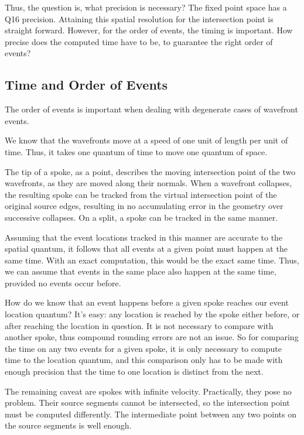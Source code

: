 \documentclass[12pt,a4paper,oneside,openany]{article}
\begin{document}
Thus, the question is, what precision is necessary? The fixed point space has a Q16 precision. Attaining this spatial resolution for the intersection point is straight forward. However, for the order of events, the timing is important. How precise does the computed time have to be, to guarantee the right order of events?

\subsection{Time and Order of Events}

The order of events is important when dealing with degenerate cases of wavefront events.

We know that the wavefronts move at a speed of one unit of length per unit of time. Thus, it takes one quantum of time to move one quantum of space.

The tip of a spoke, as a point, describes the moving intersection point of the two wavefronts, as they are moved along their normals. When a wavefront collapses, the resulting spoke can be tracked from the virtual intersection point of the original source edges, resulting in no accumulating error in the geometry over successive collapses. On a split, a spoke can be tracked in the same manner.

Assuming that the event locations tracked in this manner are accurate to the spatial quantum, it follows that all events at a given point must happen at the same time. With an exact computation, this would be the exact same time. Thus, we can assume that events in the same place also happen at the same time, provided no events occur before.

How do we know that an event happens before a given spoke reaches our event location quantum? It's easy: any location is reached by the spoke either before, or after reaching the location in question. It is not necessary to compare with another spoke, thus compound rounding errors are not an issue. So for comparing the time on any two events for a given spoke, it is only necessary to compute time to the location quantum, and this comparison only has to be made with enough precision that the time to one location is distinct from the next.

The remaining caveat are spokes with infinite velocity. Practically, they pose no problem. Their source segments cannot be intersected, so the intersection point must be computed differently. The intermediate point between any two points on the source segments is well enough.
\end{document}
